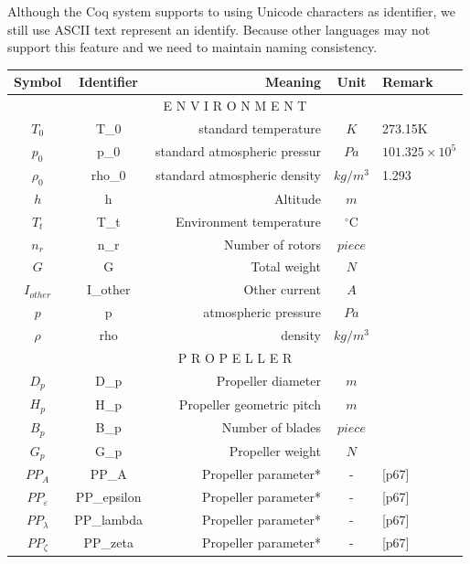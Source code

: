 \documentclass{article} %
\numberwithin{equation}{section} %
\begin{document}
Although the Coq system supports to using Unicode characters as identifier, we still use ASCII text represent an identify.
Because other languages may not support this feature and we need to maintain naming consistency.


{\footnotesize
\begin{tabular}{c|c|r|c|l}
\toprule
\textbf{Symbol} 		& \textbf{Identifier} & \textbf{Meaning} 			& \textbf{Unit} 	& \textbf{Remark} \\
\midrule
\multicolumn{5}{c}{E N V I R O N M E N T}\\ 
\hline
$T_0$ 					& T\_0 			& standard temperature				& $K$   			& 273.15K	\\
$p_0$					& p\_0 			& standard atmospheric pressur		& $Pa$				& $101.325\times10^5$	\\ 
$\rho_0$				& rho\_0 		& standard atmospheric density		& $kg/m^3$			& 1.293	\\
$h$						& h 			& Altitude							& $m$				& \\
$T_t$					& T\_t 			& Environment temperature			& $^{\circ}$C		& \\
$n_r$					& n\_r 			& Number of rotors					& $piece$			& \\
$G$						& G 			& Total weight	 					& $N$ 				& \\
$I_{other}$				& I\_other		& Other current	 					& $A$ 				& \\
$p$						& p 			& atmospheric pressure				& $Pa$				& \\
$\rho$					& rho 			& density							& $kg/m^3$			& \\
\hline
\multicolumn{5}{c}{P R O P E L L E R}\\ 
\hline
$D_p$					& D\_p 			& Propeller diameter				& $m$				& \\
$H_p$					& H\_p 			& Propeller geometric pitch			& $m$				& \\
$B_p$					& B\_p 			& Number of blades					& $piece$			& \\
$G_p$      		       	& G\_p			& Propeller weight                  & $N$          		& \\
$PP_A$     		   		& PP\_A			& Propeller parameter*        		& -          		& \cite{qq}[p67]\\
$PP_\varepsilon$ 	   	& PP\_epsilon	& Propeller parameter*        		& -          		& \cite{qq}[p67]\\
$PP_\lambda$     	   	& PP\_lambda	& Propeller parameter*        		& -          		& \cite{qq}[p67]\\
$PP_\zeta$       	   	& PP\_zeta		& Propeller parameter*        		& -          		& \cite{qq}[p67]\\

\end{tabular}}
\end{document}
